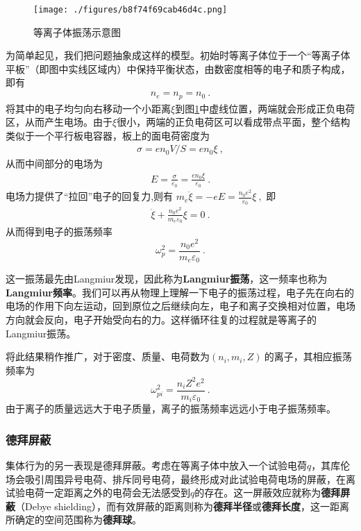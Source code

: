 \begin{figure}[ht]
\centering
\texttt{[image: ./figures/b8f74f69cab46d4c.png]}
\caption{等离子体振荡示意图} \label{fig_Plasma_1}
\end{figure}

为简单起见，我们把问题抽象成这样的模型。初始时等离子体位于一个“等离子体平板”（即图中实线区域内）中保持平衡状态，由数密度相等的电子和质子构成，即有
			\begin{align}
				n_e=n_p=n_0~.
			\end{align}
			将其中的电子均匀向右移动一个小距离$\xi$到图\ref{fig_Plasma_1}中虚线位置，两端就会形成正负电荷区，从而产生电场。由于$\xi$很小，两端的正负电荷区可以看成带点平面，整个结构类似于一个平行板电容器，板上的面电荷密度为
			\begin{align}
			\sigma=en_0V/S=en_0\xi~,
			\end{align}
			从而中间部分的电场为
			\begin{align}
			E=\frac{\sigma}{\varepsilon_0}=\frac{en_0\xi}{\varepsilon_0}~.
			\end{align}
			电场力提供了“拉回”电子的回复力,则有
			$m_e\ddot{\xi}=-eE=\frac{n_0e^2}{\varepsilon_0}\xi~,$
			即
			\begin{align}
			\ddot{\xi}+\frac{n_0e^2}{m_e\varepsilon_0}\xi=0~.
			\end{align}
			从而得到电子的振荡频率
			\begin{equation}
			\boxed{\omega_p^2=\frac{n_0e^2}{m_e\varepsilon_0}}~.
			\end{equation}
			
			这一振荡最先由Langmiur发现，因此称为\textbf{Langmiur振荡}，这一频率也称为\textbf{Langmiur频率}。我们可以再从物理上理解一下电子的振荡过程，电子先在向右的电场的作用下向左运动，回到原位之后继续向左，电子和离子交换相对位置，电场方向就会反向，电子开始受向右的力。这样循环往复的过程就是等离子的Langmiur振荡。
			
			将此结果稍作推广，对于密度、质量、电荷数为$(n_i,m_i,Z)~$的离子，其相应振荡频率为
			\begin{equation}
			\omega_{pi}^2=\frac{n_i Z^2e^2}{m_i\varepsilon_0}~.
			\end{equation}
			由于离子的质量远远大于电子质量，离子的振荡频率远远小于电子振荡频率。


\subsubsection{德拜屏蔽}
			
集体行为的另一表现是德拜屏蔽。考虑在等离子体中放入一个试验电荷$q$，其库伦场会吸引周围异号电荷、排斥同号电荷，最终形成对此试验电荷电场的屏蔽，在离试验电荷一定距离之外的电荷会无法感受到$q$的存在。这一屏蔽效应就称为\textbf{德拜屏蔽}（Debye shielding），而有效屏蔽的距离则称为\textbf{德拜半径}或\textbf{德拜长度}，这一距离所确定的空间范围称为\textbf{德拜球}。

